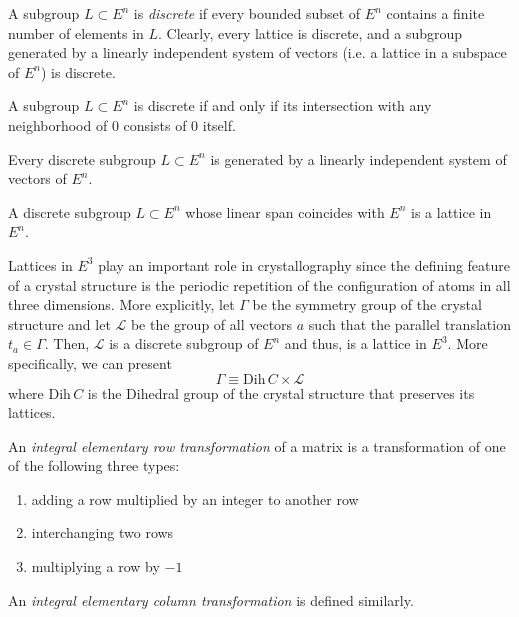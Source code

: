 \documentclass{article}
\begin{document}
  \begin{definition}
    A subgroup $L \subset E^n$ is \textit{discrete} if every bounded subset of $E^n$ contains a finite number of elements in $L$. Clearly, every lattice is discrete, and a subgroup generated by a linearly independent system of vectors (i.e. a lattice in a subspace of $E^n$) is discrete. 
  \end{definition}

  \begin{proposition}
    A subgroup $L \subset E^n$ is discrete if and only if its intersection with any neighborhood of $0$ consists of $0$ itself. 
  \end{proposition}

  \begin{theorem}
    Every discrete subgroup $L \subset E^n$ is generated by a linearly independent system of vectors of $E^n$. 
  \end{theorem}

  \begin{corollary}
    A discrete subgroup $L \subset E^n$ whose linear span coincides with $E^n$ is a lattice in $E^n$. 
  \end{corollary}

  Lattices in $E^3$ play an important role in crystallography since the defining feature of a crystal structure is the periodic repetition of the configuration of atoms in all three dimensions. More explicitly, let $\Gamma$ be the symmetry group of the crystal structure and let $\mathcal{L}$ be the group of all vectors $a$ such that the parallel translation $t_a \in \Gamma$. Then, $\mathcal{L}$ is a discrete subgroup of $E^n$ and thus, is a lattice in $E^3$. More specifically, we can present 
  \begin{equation}
    \Gamma \equiv \text{Dih}\,C \times \mathcal{L}
  \end{equation}
  where Dih$\, C$ is the Dihedral group of the crystal structure that preserves its lattices. 

  \begin{definition}
    An \textit{integral elementary row transformation} of a matrix is a transformation of one of the following three types: 
    \begin{enumerate}
      \item adding a row multiplied by an integer to another row
      \item interchanging two rows
      \item multiplying a row by $-1$ 
    \end{enumerate}
    An \textit{integral elementary column transformation} is defined similarly. 
  \end{definition}
\end{document}
